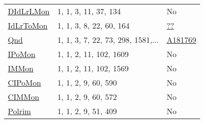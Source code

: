 {\begin{tabular}{|l|l|l|}
\hyperlink{DIdLrLMon}{DIdLrLMon}& 1, 1, 3, 11, 37, 134 &No\\
\hyperlink{IdLrToMon}{IdLrToMon}& 1, 1, 3, 8, 22, 60, 164 &\href{http://oeis.org/A155020}{??}\\
\hyperlink{Qnd}{Qnd}& 1, 1, 3, 7, 22, 73, 298, 1581,... &\href{http://oeis.org/A181769}{A181769}\\
\hyperlink{IPoMon}{IPoMon}& 1, 1, 2, 11, 102, 1609 &No\\
\hyperlink{IMMon}{IMMon}& 1, 1, 2, 11, 102, 1569 &No\\
\hyperlink{CIPoMon}{CIPoMon}& 1, 1, 2, 9, 60, 590 &No\\
\hyperlink{CIMMon}{CIMMon}& 1, 1, 2, 9, 60, 572 &No\\
\hyperlink{Polrim}{Polrim}& 1, 1, 2, 9, 51, 409 &No\\
\end{tabular}

}
